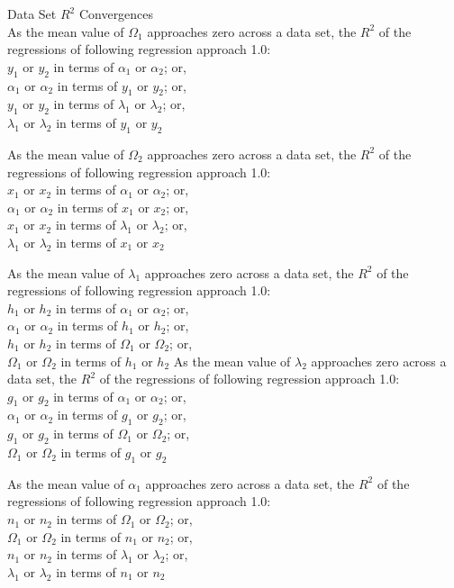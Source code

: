 \begin{corollary} Data Set $R^2$ Convergences\\
As the mean value of $\Omega_{1}$ approaches zero across a data set, the $R^2$ of the regressions of following regression approach 1.0:\\
$y_{1}$ or $y_{2}$ in terms of $\alpha_{1}$ or $\alpha_{2}$; or,\\
$\alpha_{1}$ or $\alpha_{2}$ in terms of $y_{1}$ or $y_{2}$; or,\\
$y_{1}$ or $y_{2}$ in terms of $\lambda_{1}$ or $\lambda_{2}$; or,\\
$\lambda_{1}$ or $\lambda_{2}$ in terms of $y_{1}$ or $y_{2}$

As the mean value of $\Omega_{2}$ approaches zero across a data set, the $R^2$ of the regressions of following regression approach 1.0:\\
$x_{1}$ or $x_{2}$ in terms of $\alpha_{1}$ or $\alpha_{2}$; or,\\
$\alpha_{1}$ or $\alpha_{2}$ in terms of $x_{1}$ or $x_{2}$; or,\\
$x_{1}$ or $x_{2}$ in terms of $\lambda_{1}$ or $\lambda_{2}$; or,\\
$\lambda_{1}$ or $\lambda_{2}$ in terms of $x_{1}$ or $x_{2}$

As the mean value of $\lambda_{1}$ approaches zero across a data set, the $R^2$ of the regressions of following regression approach 1.0:\\
$h_{1}$ or $h_{2}$ in terms of $\alpha_{1}$ or $\alpha_{2}$; or,\\
$\alpha_{1}$ or $\alpha_{2}$ in terms of $h_{1}$ or $h_{2}$; or,\\
$h_{1}$ or $h_{2}$ in terms of $\Omega_{1}$ or $\Omega_{2}$; or,\\
$\Omega_{1}$ or $\Omega_{2}$ in terms of $h_{1}$ or $h_{2}$
\newpage
As the mean value of $\lambda_{2}$ approaches zero across a data set, the $R^2$ of the regressions of following regression approach 1.0:\\
$g_{1}$ or $g_{2}$ in terms of $\alpha_{1}$ or $\alpha_{2}$; or,\\
$\alpha_{1}$ or $\alpha_{2}$ in terms of $g_{1}$ or $g_{2}$; or,\\
$g_{1}$ or $g_{2}$ in terms of $\Omega_{1}$ or $\Omega_{2}$; or,\\
$\Omega_{1}$ or $\Omega_{2}$ in terms of $g_{1}$ or $g_{2}$

As the mean value of $\alpha_{1}$ approaches zero across a data set, the $R^2$ of the regressions of following regression approach 1.0:\\
$n_{1}$ or $n_{2}$ in terms of $\Omega_{1}$ or $\Omega_{2}$; or,\\
$\Omega_{1}$ or $\Omega_{2}$ in terms of $n_{1}$ or $n_{2}$; or,\\
$n_{1}$ or $n_{2}$ in terms of $\lambda_{1}$ or $\lambda_{2}$; or,\\
$\lambda_{1}$ or $\lambda_{2}$ in terms of $n_{1}$ or $n_{2}$


\end{corollary}
